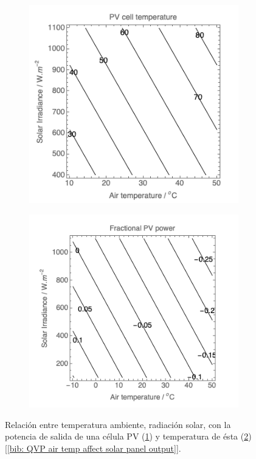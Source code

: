\documentclass[12pt]{article}
\begin{document}
	\begin{figure}[h!]
		\begin{subfigure}{0.52\textwidth}
			\includegraphics[width=1\textwidth]{img/PVcellTemp_AirTemp.png} 
			\caption{}
			\label{fig: solar cell temp vs air temp.}
		\end{subfigure}
		\begin{subfigure}{0.55\textwidth}
			\includegraphics[width=1\linewidth]{img/powerPVCell_airTemp.png}
			\caption{}
			\label{fig:power output of a solar cell vs air temp.}
		\end{subfigure}
		\caption{Relación entre temperatura ambiente, radiación solar, con la potencia de salida de una célula PV (\ref{fig: solar cell temp vs air temp.}) y temperatura de ésta (\ref{fig:power output of a solar cell vs air temp.}) [\ref{bib: QVP air temp affect solar panel output}].}
		\label{fig:solar temp}
	\end{figure}
	
\end{document}
